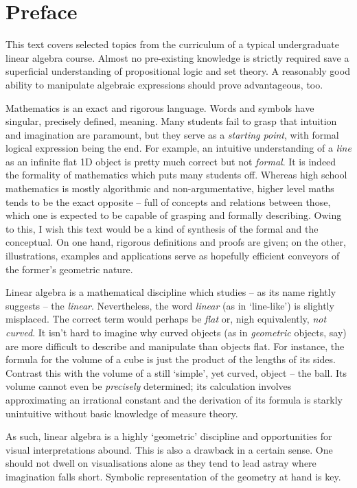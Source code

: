 \chapter*{Preface}

This text covers selected topics from the curriculum of a typical undergraduate
linear algebra course. Almost no pre-existing knowledge is strictly required
save a superficial understanding of propositional logic and set theory. A
reasonably good ability to manipulate algebraic expressions should prove
advantageous, too.

Mathematics is an exact and rigorous language. Words and symbols have singular,
precisely defined, meaning. Many students fail to grasp that intuition and
imagination are paramount, but they serve as a \emph{starting point}, with
formal logical expression being the end. For example, an intuitive understanding
of a \emph{line} as an infinite flat 1D object is pretty much correct but not
\emph{formal}. It is indeed the formality of mathematics which puts many
students off. Whereas high school mathematics is mostly algorithmic and
non-argumentative, higher level maths tends to be the exact opposite -- full of
concepts and relations between those, which one is expected to be capable of
grasping and formally describing. Owing to this, I wish this text would be a
kind of synthesis of the formal and the conceptual. On one hand, rigorous
definitions and proofs are given; on the other, illustrations, examples and
applications serve as hopefully efficient conveyors of the former's geometric
nature.

Linear algebra is a mathematical discipline which studies -- as its name rightly
suggests -- the \emph{linear}. Nevertheless, the word \emph{linear} (as in
`line-like') is slightly misplaced. The correct term would perhaps be
\emph{flat} or, nigh equivalently, \emph{not curved}. It isn't hard to imagine
why curved objects (as in \emph{geometric} objects, say) are more difficult to
describe and manipulate than objects flat. For instance, the formula for the
volume of a cube is just the product of the lengths of its sides. Contrast this
with the volume of a still `simple', yet curved, object -- the ball. Its volume
cannot even be \emph{precisely} determined; its calculation involves
approximating an irrational constant and the derivation of its formula is
starkly unintuitive without basic knowledge of measure theory.

As such, linear algebra is a highly `geometric' discipline and opportunities for
visual interpretations abound. This is also a drawback in a certain sense. One
should not dwell on visualisations alone as they tend to lead astray where
imagination falls short. Symbolic representation of the geometry at hand is
key.

